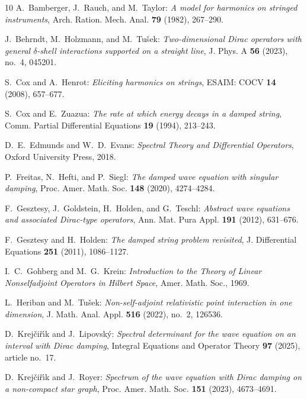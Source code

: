 \documentclass[11pt, a4paper,reqno]{amsart}
\theoremstyle{plain}
\theoremstyle{definition}
\theoremstyle{remark}
\newcommand{\1}{\mathds 1}
\begin{document}
\begin{thebibliography}{10}
A.~Bamberger, J.~Rauch, and M.~Taylor: \emph{A model for harmonics on stringed instruments}, Arch. Ration. Mech. Anal. \textbf{79} (1982), 267--290.

J.~Behrndt, M.~Holzmann, and M.~Tu\v{s}ek: \emph{Two-dimensional Dirac operators with general $\delta$-shell interactions supported on a straight line}, J. Phys. A \textbf{56} (2023), no.~4, 045201.

S.~Cox and A.~Henrot: \emph{Eliciting harmonics on strings}, ESAIM: COCV \textbf{14} (2008), 657--677.

S.~Cox and E.~Zuazua: \emph{The rate at which energy decays in a damped string}, Comm. Partial Differential Equations \textbf{19} (1994), 213--243.

D.~E.~Edmunds and W.~D.~Evans: \emph{Spectral Theory and Differential Operators}, Oxford University Press, 2018.

P.~Freitas, N.~Hefti, and P.~Siegl: \emph{The damped wave equation with singular damping}, Proc. Amer. Math. Soc. \textbf{148} (2020), 4274--4284.

F.~Gesztesy, J.~Goldstein, H.~Holden, and G.~Teschl: \emph{Abstract wave equations and associated Dirac-type operators}, Ann. Mat. Pura Appl. \textbf{191} (2012), 631--676.

F.~Gesztesy and H.~Holden: \emph{The damped string problem revisited}, J. Differential Equations \textbf{251} (2011), 1086--1127.

I.~C.~Gohberg and M.~G.~Krein: \emph{Introduction to the Theory of Linear Nonselfadjoint Operators in Hilbert Space}, Amer. Math. Soc., 1969.

L.~Heriban and M.~Tu\v{s}ek: \emph{Non-self-adjoint relativistic point interaction in one dimension}, J. Math. Anal. Appl. \textbf{516} (2022), no.~2, 126536.

D.~Krej\v{c}i\v{r}\'\i k and J.~Lipovsk\'y: \emph{Spectral determinant for the wave equation on an interval with Dirac damping}, Integral Equations and Operator Theory \textbf{97} (2025), article no.~17.

D.~Krej\v{c}i\v{r}\'\i k and J.~Royer: \emph{Spectrum of the wave equation with Dirac damping on a non-compact star graph}, Proc. Amer. Math. Soc. \textbf{151} (2023), 4673--4691.


\end{thebibliography}
\end{document}
